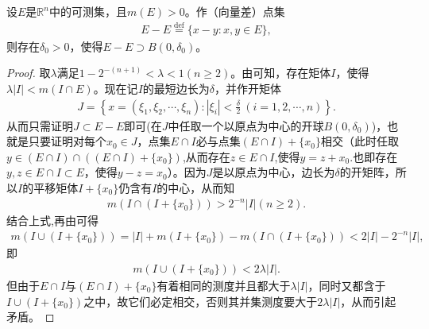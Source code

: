 \documentclass[../../main.tex]{subfiles}%
\begin{document}
\begin{theorem}[Steinhaus定理]\label{theorem:Steinhaus定理}
设\(E\)是\(\mathbb{R}^n\)中的可测集，且\(m(E)>0\)。作（向量差）点集
\begin{align*}
E - E \stackrel{\text{def}}{=} \{x - y: x,y \in E\},
\end{align*}
则存在\(\delta_0>0\)，使得\(E - E \supset B(0,\delta_0)\)。
\end{theorem}
\begin{proof}
取\(\lambda\)满足\(1 - 2^{-(n + 1)}<\lambda<1\)$(n\geqslant  2)$。由可知，存在矩体\(I\)，使得\(\lambda|I|<m(I\cap E)\)。现在记\(I\)的最短边长为\(\delta\)，并作开矩体
\begin{align*}
J = \left\{x = (\xi_1,\xi_2,\cdots,\xi_n): |\xi_i|<\frac{\delta}{2}\ (i = 1,2,\cdots,n)\right\}.
\end{align*}
从而只需证明\(J\subset E - E\)即可(在$J$中任取一个以原点为中心的开球$B(0,\delta_0)$)，也就是只要证明对每个\(x_0\in J\)，点集\(E\cap I\)必与点集\((E\cap I)+\{x_0\}\)相交（此时任取$y\in (E\cap I)\cap((E\cap I)+\{x_0\})$,从而存在$z\in E\cap I$,使得$y=z+x_0$.也即存在\(y,z\in E\cap I\subset E\)，使得\(y - z = x_0\)）。因为\(J\)是以原点为中心，边长为\(\delta\)的开矩阵，所以\(I\)的平移矩体\(I+\{x_0\}\)仍含有\(I\)的中心，从而知
\begin{align*}
m(I\cap (I+\{x_0\}))>2^{-n}|I|(n\geqslant  2).
\end{align*}
结合上式,再由可得
\begin{align*}
m(I\cup (I+\{x_0\}))=|I|+m(I+\{x_0\})-m(I\cap (I+\{x_0\}))
<2|I|-2^{-n}|I|,
\end{align*}
即
\begin{align*}
m(I\cup (I+\{x_0\}))<2\lambda|I|.
\end{align*}
但由于\(E\cap I\)与\((E\cap I)+\{x_0\}\)有着相同的测度并且都大于\(\lambda|I|\)，同时又都含于\(I\cup (I+\{x_0\})\)之中，故它们必定相交，否则其并集测度要大于\(2\lambda|I|\)，从而引起矛盾。
\end{proof} 
\end{document}
